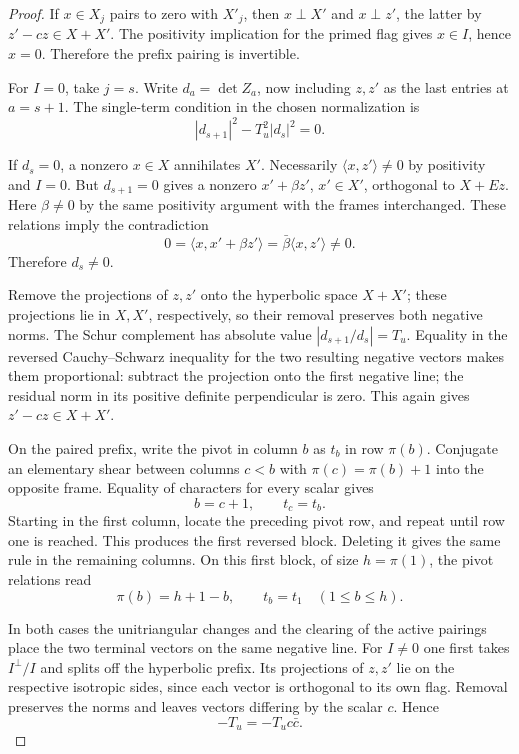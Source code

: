 \begin{proof}
If \(x\in X_j\) pairs to zero with \(X'_j\), then \(x\perp X'\) and \(x\perp z'\), the latter by \(z'-cz\in X+X'\). The positivity implication for the primed flag gives \(x\in I\), hence \(x=0\). Therefore the prefix pairing is invertible.

For \(I=0\), take \(j=s\). Write \(d_a=\det Z_a\), now including \(z,z'\) as the last entries at \(a=s+1\). The single-term condition in the chosen normalization is
\[
      |d_{s+1}|^2-T_u^2|d_s|^2=0 .
\]


If \(d_s=0\), a nonzero \(x\in X\) annihilates \(X'\). Necessarily \(\langle x,z'\rangle\ne0\) by positivity and \(I=0\). But \(d_{s+1}=0\) gives a nonzero \(x'+\beta z'\), \(x'\in X'\), orthogonal to \(X+Ez\). Here \(\beta\ne0\) by the same positivity argument with the frames interchanged. These relations imply the contradiction
\[
        0=\langle x,x'+\beta z'\rangle
             =\bar\beta\langle x,z'\rangle\ne0 .
\]
Therefore \(d_s\ne0\).

 Remove the projections of \(z,z'\) onto the hyperbolic space \(X+X'\); these projections lie in \(X,X'\), respectively, so their removal preserves both negative norms. The Schur complement has absolute value \(|d_{s+1}/d_s|=T_u\). Equality in the reversed Cauchy--Schwarz inequality for the two resulting negative vectors makes them proportional: subtract the projection onto the first negative line; the residual norm in its positive definite perpendicular is zero. This again gives \(z'-cz\in X+X'\).

On the paired prefix, write the pivot in column \(b\) as \(t_b\) in row \(\pi(b)\). Conjugate an elementary shear between columns \(c<b\) with \(\pi(c)=\pi(b)+1\) into the opposite frame. Equality of characters for every scalar gives
\[
              b=c+1,\qquad t_c=t_b .
\]
Starting in the first column, locate the preceding pivot row, and repeat until row one is reached. This produces the first reversed block. Deleting it gives the same rule in the remaining columns. On this first block, of size \(h=\pi(1)\), the pivot relations read
\[
      \pi(b)=h+1-b,\qquad t_b=t_1\quad (1\le b\le h).
\]

In both cases the unitriangular changes and the clearing of the active pairings place the two terminal vectors on the same negative line. For \(I\ne0\) one first takes \(I^\perp/I\) and splits off the hyperbolic prefix. Its projections of \(z,z'\) lie on the respective isotropic sides, since each vector is orthogonal to its own flag. Removal preserves the norms and leaves vectors differing by the scalar \(c\). Hence
\[
               -T_u=-T_u c\bar c .
\]


\end{proof}
